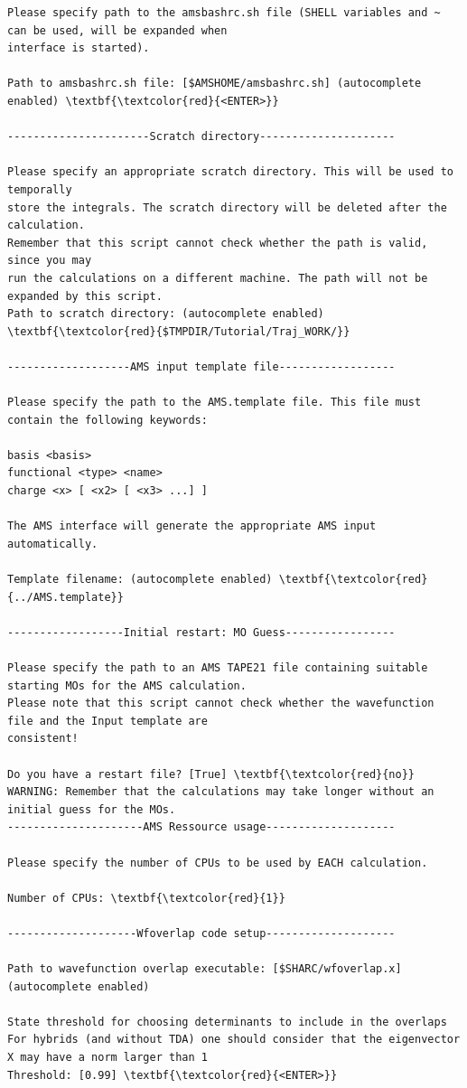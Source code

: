 \documentclass[a4paper,11pt,DIV=15,openany]{scrbook}
\begin{document}
\begin{oframed}
\begin{Verbatim}[commandchars=\\\{\}]
Please specify path to the amsbashrc.sh file (SHELL variables and ~ can be used, will be expanded when 
interface is started).

Path to amsbashrc.sh file: [$AMSHOME/amsbashrc.sh] (autocomplete enabled) \textbf{\textcolor{red}{<ENTER>}}

----------------------Scratch directory---------------------

Please specify an appropriate scratch directory. This will be used to temporally 
store the integrals. The scratch directory will be deleted after the calculation. 
Remember that this script cannot check whether the path is valid, since you may 
run the calculations on a different machine. The path will not be expanded by this script.
Path to scratch directory: (autocomplete enabled) \textbf{\textcolor{red}{$TMPDIR/Tutorial/Traj_WORK/}}

-------------------AMS input template file------------------

Please specify the path to the AMS.template file. This file must contain the following keywords:

basis <basis>
functional <type> <name>
charge <x> [ <x2> [ <x3> ...] ]

The AMS interface will generate the appropriate AMS input automatically.

Template filename: (autocomplete enabled) \textbf{\textcolor{red}{../AMS.template}}

------------------Initial restart: MO Guess-----------------

Please specify the path to an AMS TAPE21 file containing suitable starting MOs for the AMS calculation. 
Please note that this script cannot check whether the wavefunction file and the Input template are 
consistent!

Do you have a restart file? [True] \textbf{\textcolor{red}{no}}
WARNING: Remember that the calculations may take longer without an initial guess for the MOs.
---------------------AMS Ressource usage--------------------

Please specify the number of CPUs to be used by EACH calculation.

Number of CPUs: \textbf{\textcolor{red}{1}} 

--------------------Wfoverlap code setup--------------------

Path to wavefunction overlap executable: [$SHARC/wfoverlap.x] (autocomplete enabled) 

State threshold for choosing determinants to include in the overlaps
For hybrids (and without TDA) one should consider that the eigenvector X may have a norm larger than 1
Threshold: [0.99] \textbf{\textcolor{red}{<ENTER>}}


\end{Verbatim}
\end{oframed}
\end{document}
